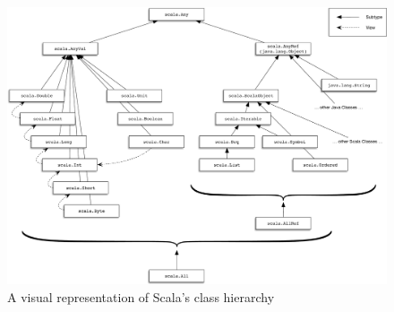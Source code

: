 \documentclass[jou,apacite]{IEEEtran}
\begin{document}
  \begin{figure}[h]
    \centering
    \includegraphics[width=\textwidth]{scala_classes}
    \caption{A visual representation of Scala's class hierarchy}
    \label{fig:example}
  \end{figure} 
\end{document}
